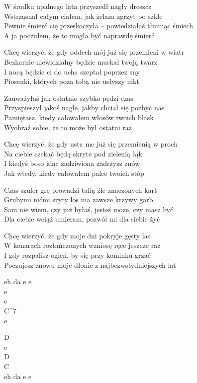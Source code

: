 \begin{text}
    \small{
    \hfill\break
W środku upalnego lata przyszedł nagły dreszcz\\
Wstrząsnął całym ciałem, jak żelaza zgrzyt po szkle\\
Pewnie śmierć cię przeskoczyła – powiedziałaś tłumiąc śmiech\\
A ja poczułem, że to mogła być naprawdę śmierć

Chcę wierzyć, że gdy oddech mój już się przemieni w wiatr\\
Bezkarnie niewidzialny będzie muskał twoją twarz\\
I nocą będzie ci do ucha szeptał poprzez sny\\
Piosenki, których poza tobą nie usłyszy nikt

Zauważyłaś jak ostatnio szybko pędzi czas\\
Przyspieszył jakoś nagle, jakby chciał się pozbyć nas\\
Pamiętasz, kiedy całowałem włosów twoich blask\\
Wyobraź sobie, że to może był ostatni raz

Chcę wierzyć, że gdy usta me już się przemienią w proch\\
Na ciebie czekać będą skryte pod zielenią łąk\\
I kiedyś boso idąc zadziwiona zadrżysz znów\\
Jak wtedy, kiedy całowałem palce twoich stóp

Czas szuler grę prowadzi talią źle znaczonych kart\\
Grubymi nićmi szyty los ma zawsze krzywy garb\\
Sam nie wiem, czy już byłaś, jesteś może, czy masz być\\
Dla ciebie wciąż umieram, pozwól mi dla siebie żyć

Chcę wierzyć, że gdy moje dni pokryje gęsty las\\
W konarach roztańczonych wzniosę ręce jeszcze raz\\
I gdy rozpalisz ogień, by się przy kominku grzać\\
Poczujesz znowu moje dłonie z najbezwstydniejszych lat
    }
\end{text}
\begin{chord}
    \small{
    eh da e e\\
    e\\
    e\\
    C^7\\
    \hfill\break
    e

    D\\
    e\\
    D\\
    C\\
    eh da e e
    }
\end{chord}